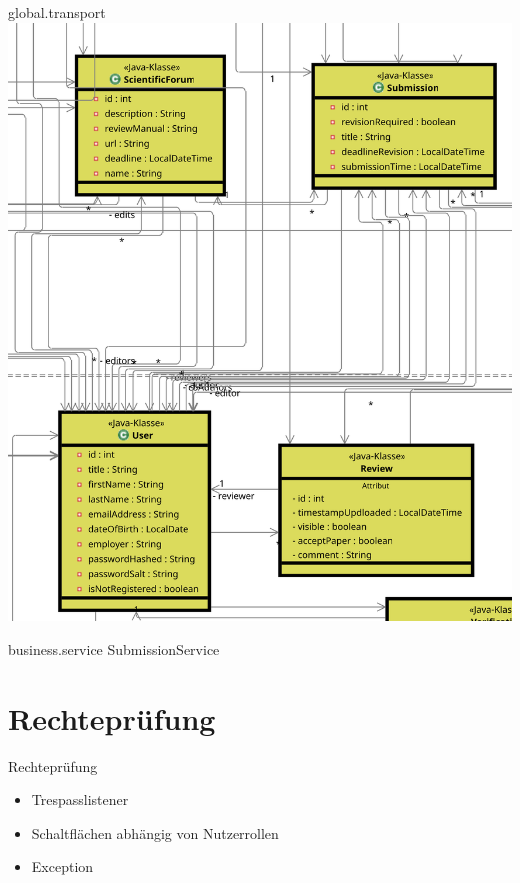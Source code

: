 \documentclass{beamer}
\begin{document}
    \begin{frame}{global.transport}
        \centering
        \includegraphics[height=0.9\textheight]{excerpts/Submission+User@3x}
    \end{frame}

    \begin{frame}{business.service}
        \centering
        SubmissionService
    \end{frame}

    \section{Rechteprüfung}

    \begin{frame}{Rechteprüfung}
        \begin{itemize}
            \item Trespasslistener \pause
            \item Schaltflächen abhängig von Nutzerrollen \pause
            \item Exception
        \end{itemize}
    \end{frame}
\end{document}
